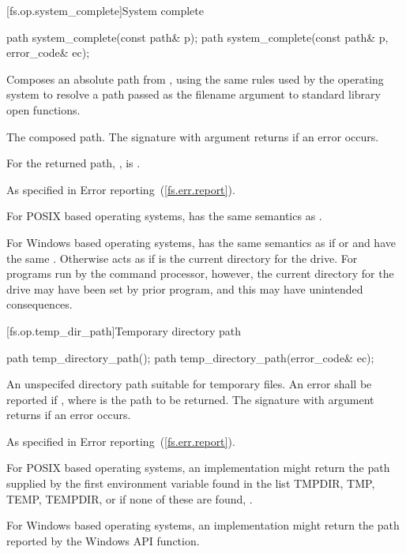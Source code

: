 [fs.op.system_complete]{System complete}

\begin{itemdecl}
path system_complete(const path& p);
path system_complete(const path& p, error_code& ec);
\end{itemdecl}

\begin{itemdescr}
\pnum
\effects Composes an absolute path from , using the
  same rules used by the operating system to resolve a path passed as the
  filename argument to standard library open functions.

\pnum
\returns The composed path. The signature with argument 
  returns  if an error occurs.

\pnum
\postcondition For the returned path, ,  is .

\pnum
\throws As specified in Error reporting~(\ref{fs.err.report}).

\pnum
\enterexample For POSIX based operating systems, 
  has the same semantics as .

\pnum
For Windows based operating systems,  has the
  same semantics as  if
   or
   and  have the same .
  Otherwise  acts as if  is
  the current directory for the  drive.
  For programs run by the command processor, however, the current directory
  for the  drive may have been set by prior program,
  and this may have unintended consequences.
\exitexample

\end{itemdescr}

[fs.op.temp_dir_path]{Temporary directory path}

\begin{itemdecl}
path temp_directory_path();
path temp_directory_path(error_code& ec);
\end{itemdecl}

\begin{itemdescr}
\pnum
\returns An unspecifed directory path suitable for temporary files. An error shall be reported if
, where  is the path to be returned.
  The signature with argument  returns  if an
  error occurs.

\pnum
\throws As specified in Error reporting~(\ref{fs.err.report}).

\pnum
\enterexample For POSIX based operating systems, an implementation might
  return the path
  supplied by the first environment variable found in the list TMPDIR, TMP, TEMP, TEMPDIR,
  or if none of these are found, .

\pnum
For Windows based operating systems, an implementation might return the path
  reported by the Windows  API function.
\exitexample
\end{itemdescr}


